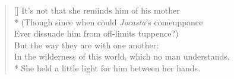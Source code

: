 \settowidth{\versewidth}{In the wilderness of this world, which no man understands,}
\begin{verse}[\versewidth]
\vin It's not that she reminds him of his mother\\*
\vin \vin (Though since when could \textit{Jocasta}'s comeuppance\\
\vin \vin Ever dissuade him from off-limits tuppence?)\\
\vin But the way they are with one another:\\
In the wilderness of this world, which no man understands,\\*
She held a little light for him between her hands.
\end{verse}
